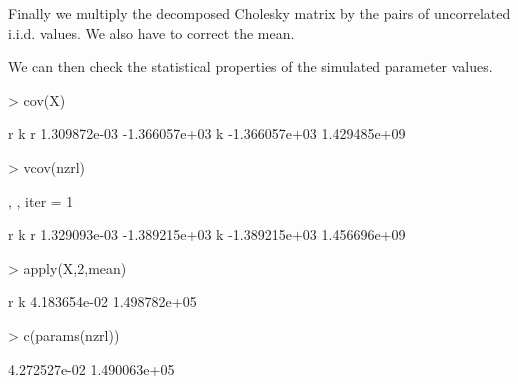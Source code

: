 \documentclass[a4paper]{article}
\begin{document}
Finally we multiply the decomposed Cholesky matrix by the pairs of uncorrelated
i.i.d. values. We also have to correct the mean.

\begin{center}
\begin{minipage}[H]{0.95\textwidth}%
\begin{shaded}%
\begin{Schunk}
\end{Schunk}
\end{shaded}%
\end{minipage}
\end{center}

We can then check the statistical properties of the simulated parameter values.
\begin{center}
\begin{minipage}[H]{0.95\textwidth}%
\begin{shaded}%
\begin{Schunk}
\begin{Sinput}
> cov(X)
\end{Sinput}
\begin{Soutput}
              r             k
r  1.309872e-03 -1.366057e+03
k -1.366057e+03  1.429485e+09
\end{Soutput}
\begin{Sinput}
> vcov(nzrl)
\end{Sinput}
\begin{Soutput}
, , iter = 1

   
                r             k
  r  1.329093e-03 -1.389215e+03
  k -1.389215e+03  1.456696e+09
\end{Soutput}
\begin{Sinput}
> apply(X,2,mean)
\end{Sinput}
\begin{Soutput}
           r            k 
4.183654e-02 1.498782e+05 
\end{Soutput}
\begin{Sinput}
> c(params(nzrl))
\end{Sinput}
\begin{Soutput}
[1] 4.272527e-02 1.490063e+05
\end{Soutput}
\end{Schunk}
\end{shaded}%
\end{minipage}
\end{center}
\end{document}
